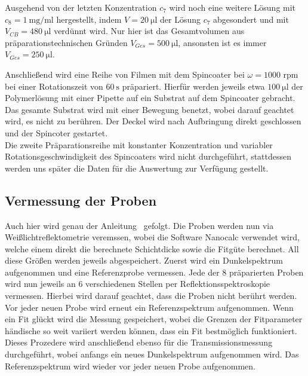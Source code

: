 Ausgehend von der letzten Konzentration $c_7$ wird noch eine weitere Lösung mit $c_8 = \SI{1}{\milli\gram\per\milli\litre}$ hergestellt, indem $V = \SI{20}{\micro\litre}$ der Lösung $c_7$ abgesondert und mit $V_{CB} = \SI{480}{\micro\litre}$ verdünnt wird. Nur hier ist das Gesamtvolumen aus präparationstechnischen Gründen $V_{Ges} = \SI{500}{\micro\litre}$, ansonsten ist es immer $V_{Ges} = \SI{250}{\micro\litre}$.


Anschließend wird eine Reihe von Filmen mit dem Spincoater bei $\omega = 1000$ rpm bei einer Rotationszeit von $\SI{60}{\second}$ präpariert. Hierfür werden jeweils etwa $\SI{100}{\micro\litre}$ der Polymerlösung mit einer Pipette auf ein Substrat auf dem Spincoater gebracht. Das gesamte Substrat wird mit einer Bewegung benetzt, wobei darauf geachtet wird, es nicht zu berühren. Der Deckel wird nach Aufbringung direkt geschlossen und der Spincoter gestartet.\\
Die zweite Präparationsreihe mit konstanter Konzentration und variabler Rotationsgeschwindigkeit des Spincoaters wird nicht durchgeführt, stattdessen werden uns später die Daten für die Auswertung zur Verfügung gestellt. 


\subsection{Vermessung der Proben}
Auch hier wird genau der Anleitung~\cite[]{Anleitung} gefolgt. Die Proben werden nun via Weißlichtreflektometrie veremssen, wobei die Software Nanocalc verwendet wird, welche einem direkt die berechnete Schichtdicke sowie die Fitgüte berechnet. All diese Größen werden jeweils abgespeichert. 
Zuerst wird ein Dunkelspektrum aufgenommen und eine Referenzprobe vermessen.
Jede der 8 präparierten Proben wird nun jeweils an 6 verschiedenen Stellen per Reflektionsspektroskopie vermessen. Hierbei wird darauf geachtet, dass die Proben nicht berührt werden. Vor jeder neuen Probe wird erneut ein Referenzspektrum aufgenommen. Wenn ein Fit glückt wird die Messung gespeichert, wobei die Grenzen der Fitparameter händische so weit variiert werden können, dass ein Fit bestmöglich funktioniert. 
Dieses Prozedere wird anschließend ebenso für die Transmissionsmessung durchgeführt, wobei anfangs ein neues Dunkelspektrum aufgenommen wird. Das Referenzspektrum wird wieder vor jeder neuen Probe aufgenommen.